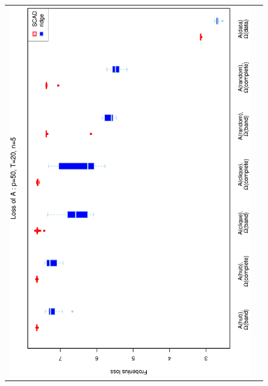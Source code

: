 \begin{figure}[h!]
\centering
\begin{tabular}{cc}
\includegraphics[scale=0.45,angle=270]{LossA50T20N5_25.eps}
\\

\end{tabular}
\end{figure}
